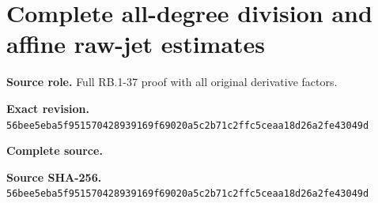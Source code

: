 \begingroup
\sloppy
\small
\clearpage
\section{Complete all-degree division and affine raw-jet estimates}
\noindent\textbf{Source role.} Full RB.1-37 proof with all original derivative factors.\par
\noindent\textbf{Exact revision.} \nolinkurl{56bee5eba5f951570428939169f69020a5c2b71c2ffc5ceaa18d26a2fe43049d}\par
\noindent\textbf{Complete source.} \par
\noindent\textbf{Source SHA-256.} \nolinkurl{56bee5eba5f951570428939169f69020a5c2b71c2ffc5ceaa18d26a2fe43049d}\par\medskip

\endgroup
